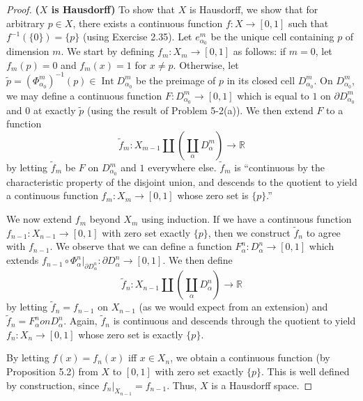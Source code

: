 \documentclass{article}
\theoremstyle{definition}
\newcommand{\R}{\mathbb{R}}
\newcommand{\p}[1]{\left(#1\right)}
\begin{document}
\begin{proof}
\textbf{($X$ is Hausdorff)}
To show that $X$ is Hausdorff, we show that for arbitrary $p \in X$, 
there exists a continuous function $f : X \to [0,1]$
such that $f^{-1}(\{0\}) = \{p\}$ (using Exercise 2.35). Let $e_{\alpha_0}^m$ be the unique
cell containing $p$ of dimension $m$. We start by defining $f_m : X_m \to [0,1]$
as follows: if $m=0$, let $f_m(p)=0$ and $f_m(x)=1$ for $x\neq p$. Otherwise, let
$\tilde{p} = (\Phi_{\alpha_0}^m)^{-1}(p) \in \operatorname{Int} D_{\alpha_0}^m$ be
the preimage of $p$ in its closed cell $D_{\alpha_0}^m$. On $D_{\alpha_0}^m$, we
may define a continuous function $F : D_{\alpha_0}^m \to [0,1]$ which is equal to 
$1$ on $\partial D_{\alpha_0}^m$ and $0$ at exactly $\tilde{p}$ (using the result of
Problem 5-2(a)). We then extend $F$ to a function
\[
\tilde{f}_m : X_{m-1} \amalg \p{\coprod_{\alpha} D_\alpha^m} \to \R
\]
by letting $\tilde{f}_m$ be $F$ on $D_{\alpha_0}^m$ and $1$ everywhere else. $\tilde{f}_m$
is ``continuous by the characteristic property of the disjoint union, and descends to the
quotient to yield a continuous function $f_m : X_m \to [0,1]$ whose zero set is $\{p\}$.''

We now extend $f_m$ beyond $X_m$ using induction. If we have a continuous function
$f_{n-1} : X_{n-1} \to [0,1]$ with zero set exactly $\{p\}$, then we construct
$\tilde{f}_n$ to agree with $f_{n-1}$. We observe that we can define a function 
$F_\alpha^n : D_\alpha^n \to [0,1]$ which extends 
$f_{n-1} \circ \Phi_\alpha^n|_{\partial D_\alpha^n} : \partial D_\alpha^n \to [0,1]$.
We then define 
\[
\tilde{f}_n : X_{n-1} \amalg \p{\coprod_\alpha D_\alpha^n} \to \R
\]
by letting $\tilde{f}_n = f_{n-1}$ on $X_{n-1}$ (as we would expect from an extension)
and $\tilde{f}_n = F^n_\alpha on D_\alpha^n$. Again, $\tilde{f}_n$ is continuous and
descends through the quotient to yield $f_n : X_n \to [0,1]$ whose zero set is exactly
$\{p\}$.

By letting $f(x) = f_n(x)$ iff $x \in X_n$, we obtain a continuous function 
(by Proposition 5.2) from $X$ to $[0,1]$ with zero set exactly $\{p\}$. This
is well defined by construction, since $f_n|_{X_{n-1}} = f_{n-1}$. Thus,
$X$ is a Hausdorff space.
\end{proof}
\end{document}
